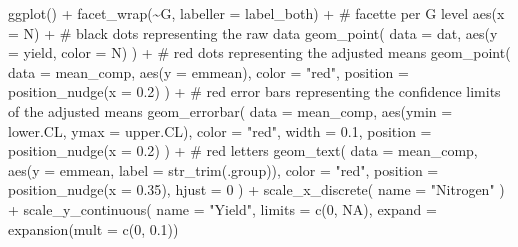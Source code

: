 \documentclass[
  letterpaper,
  DIV=11,
  numbers=noendperiod]{scrartcl}
\newenvironment{Shaded}{\begin{snugshade}}{\end{snugshade}}
\newcommand{\AttributeTok}[1]{\textcolor[rgb]{0.40,0.45,0.13}{#1}}
\newcommand{\CommentTok}[1]{\textcolor[rgb]{0.37,0.37,0.37}{#1}}
\newcommand{\ConstantTok}[1]{\textcolor[rgb]{0.56,0.35,0.01}{#1}}
\newcommand{\DecValTok}[1]{\textcolor[rgb]{0.68,0.00,0.00}{#1}}
\newcommand{\FloatTok}[1]{\textcolor[rgb]{0.68,0.00,0.00}{#1}}
\newcommand{\FunctionTok}[1]{\textcolor[rgb]{0.28,0.35,0.67}{#1}}
\newcommand{\NormalTok}[1]{\textcolor[rgb]{0.00,0.23,0.31}{#1}}
\newcommand{\SpecialCharTok}[1]{\textcolor[rgb]{0.37,0.37,0.37}{#1}}
\newcommand{\StringTok}[1]{\textcolor[rgb]{0.13,0.47,0.30}{#1}}
\begin{document}
\begin{Shaded}
\begin{Highlighting}[]
\FunctionTok{ggplot}\NormalTok{() }\SpecialCharTok{+}
  \FunctionTok{facet\_wrap}\NormalTok{(}\SpecialCharTok{\textasciitilde{}}\NormalTok{G, }\AttributeTok{labeller =}\NormalTok{ label\_both) }\SpecialCharTok{+} \CommentTok{\# facette per G level}
  \FunctionTok{aes}\NormalTok{(}\AttributeTok{x =}\NormalTok{ N) }\SpecialCharTok{+}
  \CommentTok{\# black dots representing the raw data}
  \FunctionTok{geom\_point}\NormalTok{(}
    \AttributeTok{data =}\NormalTok{ dat,}
    \FunctionTok{aes}\NormalTok{(}\AttributeTok{y =}\NormalTok{ yield, }\AttributeTok{color =}\NormalTok{ N)}
\NormalTok{  ) }\SpecialCharTok{+}
  \CommentTok{\# red dots representing the adjusted means}
  \FunctionTok{geom\_point}\NormalTok{(}
    \AttributeTok{data =}\NormalTok{ mean\_comp,}
    \FunctionTok{aes}\NormalTok{(}\AttributeTok{y =}\NormalTok{ emmean),}
    \AttributeTok{color =} \StringTok{"red"}\NormalTok{,}
    \AttributeTok{position =} \FunctionTok{position\_nudge}\NormalTok{(}\AttributeTok{x =} \FloatTok{0.2}\NormalTok{)}
\NormalTok{  ) }\SpecialCharTok{+}
  \CommentTok{\# red error bars representing the confidence limits of the adjusted means}
  \FunctionTok{geom\_errorbar}\NormalTok{(}
    \AttributeTok{data =}\NormalTok{ mean\_comp,}
    \FunctionTok{aes}\NormalTok{(}\AttributeTok{ymin =}\NormalTok{ lower.CL, }\AttributeTok{ymax =}\NormalTok{ upper.CL),}
    \AttributeTok{color =} \StringTok{"red"}\NormalTok{,}
    \AttributeTok{width =} \FloatTok{0.1}\NormalTok{,}
    \AttributeTok{position =} \FunctionTok{position\_nudge}\NormalTok{(}\AttributeTok{x =} \FloatTok{0.2}\NormalTok{)}
\NormalTok{  ) }\SpecialCharTok{+}
  \CommentTok{\# red letters }
  \FunctionTok{geom\_text}\NormalTok{(}
    \AttributeTok{data =}\NormalTok{ mean\_comp,}
    \FunctionTok{aes}\NormalTok{(}\AttributeTok{y =}\NormalTok{ emmean, }\AttributeTok{label =} \FunctionTok{str\_trim}\NormalTok{(.group)),}
    \AttributeTok{color =} \StringTok{"red"}\NormalTok{,}
    \AttributeTok{position =} \FunctionTok{position\_nudge}\NormalTok{(}\AttributeTok{x =} \FloatTok{0.35}\NormalTok{),}
    \AttributeTok{hjust =} \DecValTok{0}
\NormalTok{  ) }\SpecialCharTok{+}
  \FunctionTok{scale\_x\_discrete}\NormalTok{(}
    \AttributeTok{name =} \StringTok{"Nitrogen"}
\NormalTok{  ) }\SpecialCharTok{+}
  \FunctionTok{scale\_y\_continuous}\NormalTok{(}
    \AttributeTok{name =} \StringTok{"Yield"}\NormalTok{,}
    \AttributeTok{limits =} \FunctionTok{c}\NormalTok{(}\DecValTok{0}\NormalTok{, }\ConstantTok{NA}\NormalTok{),}
    \AttributeTok{expand =} \FunctionTok{expansion}\NormalTok{(}\AttributeTok{mult =} \FunctionTok{c}\NormalTok{(}\DecValTok{0}\NormalTok{, }\FloatTok{0.1}\NormalTok{))}

\end{Highlighting}
\end{Shaded}
\end{document}
